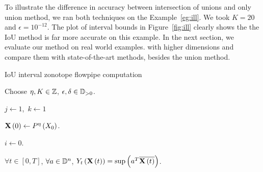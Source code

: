 %
To illustrate the difference in accuracy between intersection of
unions and only union method, we ran both techniques on the
Example~\ref{eg:ill}.  We took $K=20$ and $\epsilon = 10^{-12}$.  The
plot of interval bounds in Figure~\ref{fig:ill} clearly shows the the
IoU method is far more accurate on this example.  In the next section,
we evaluate our method on real world examples. with higher dimensions
and compare them with state-of-the-art methods, besides the union
method.
%
\begin{algorithm}\caption{IoU interval zonotope
flowpipe computation}\label{alg:main}


Choose $\eta,K\in\mathbb{Z}$, $\epsilon,\delta\in\mathbb{D}_{>0}$.

$j\gets 1$,~$k\gets 1$\;~\label{algstep:assign1}

$\mathbf{X}\left(0\right)\gets P^{\eta}\left(X_0\right)$.~\label{algstep:assign2}

$i\gets 0.$

$\forall t\in[0,T]$, $\forall a\in\mathbb{D}^n$, $Y_{t}\left(\mathbf{X}\left(t\right)\right)
= \sup\left(a^T\overline{\mathbf{X}\left(t\right)}\right)$.
\end{algorithm}
%
